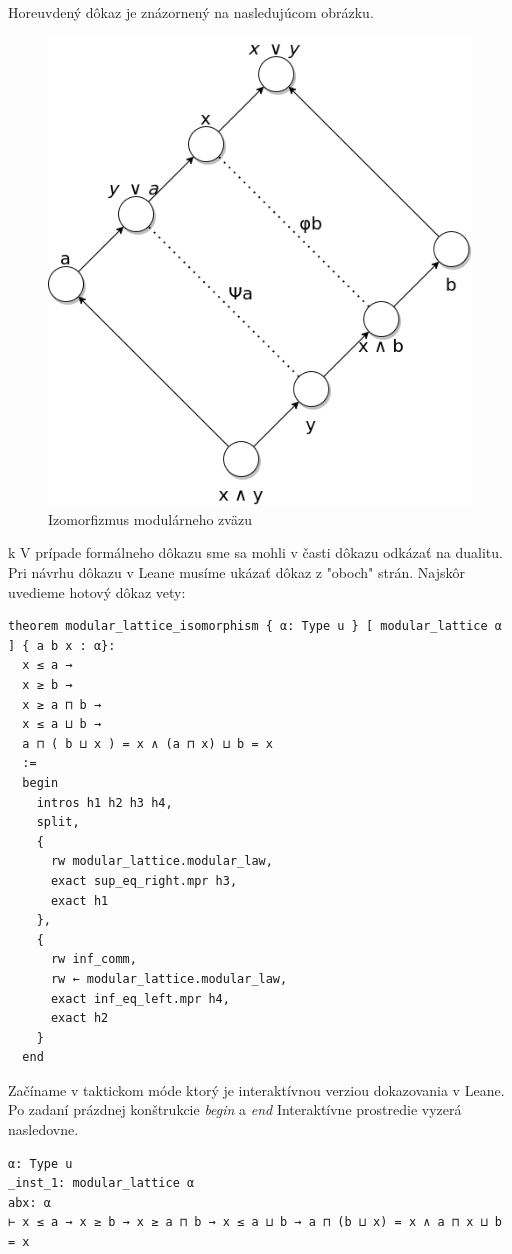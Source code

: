 \documentclass[a4paper,10pt,oneside]{report}%
\begin{document}
    Horeuvdený dôkaz je znázornený na nasledujúcom obrázku.

\begin{figure}[!ht]
    \centering
    \includegraphics[scale=0.35]{modular_lattice_isomorphism.png}
    \caption{Izomorfizmus modulárneho zväzu}
\end{figure}
k
    V prípade formálneho dôkazu sme sa mohli v časti dôkazu odkázať na dualitu.
    Pri návrhu dôkazu v Leane musíme ukázať dôkaz z "oboch" strán. Najskôr uvedieme
hotový dôkaz vety:
\begin{lstlisting}
theorem modular_lattice_isomorphism { α: Type u } [ modular_lattice α ] { a b x : α}:
  x ≤ a →
  x ≥ b →
  x ≥ a ⊓ b →
  x ≤ a ⊔ b →
  a ⊓ ( b ⊔ x ) = x ∧ (a ⊓ x) ⊔ b = x
  :=
  begin
    intros h1 h2 h3 h4,
    split,
    {
      rw modular_lattice.modular_law,
      exact sup_eq_right.mpr h3,
      exact h1
    },
    {
      rw inf_comm,
      rw ← modular_lattice.modular_law,
      exact inf_eq_left.mpr h4,
      exact h2
    }
  end
\end{lstlisting}
    Začíname v taktickom móde ktorý je interaktívnou verziou dokazovania v Leane.
    Po zadaní prázdnej konštrukcie \emph{begin} a \emph{end}
    Interaktívne prostredie vyzerá nasledovne.
\begin{lstlisting}
α: Type u
_inst_1: modular_lattice α
abx: α
⊢ x ≤ a → x ≥ b → x ≥ a ⊓ b → x ≤ a ⊔ b → a ⊓ (b ⊔ x) = x ∧ a ⊓ x ⊔ b = x
\end{lstlisting}
\end{document}
